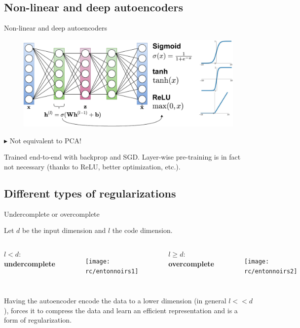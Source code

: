 \documentclass[handout]{beamer}
\begin{document}
  \subsection{Non-linear and deep autoencoders}

  \begin{frame}{Non-linear and deep autoencoders}

    \begin{figure}
      \includegraphics[width=\textwidth]{rc/deep-autoencoder}
    \end{figure}
    
    \pause
    \centering
    $\blacktriangleright$ \alert{Not equivalent to PCA!}

    \pause
    {\small Trained end-to-end with backprop and SGD. Layer-wise pre-training \cite{Hinton2006} is in fact not necessary (thanks to ReLU, better optimization, etc.).}

  \end{frame}

  \subsection{Different types of regularizations}

  \begin{frame}{Undercomplete or overcomplete}

    Let $d$ be the input dimension and $l$ the code dimension.
    \pause
    \vspace{0.5cm}
    \begin{columns}[T,onlytextwidth]
      \centering
      $l < d$: \textbf{undercomplete}
      \begin{figure}
        \texttt{[image: rc/entonnoirs1]}
      \end{figure}
      \pause
      \centering
      $l \geq d$: \textbf{overcomplete}
      \begin{figure}
        \texttt{[image: rc/entonnoirs2]}
      \end{figure}
    \end{columns}
    \vspace{0.5cm}
    \pause
    Having the autoencoder encode the data to a lower dimension (in general $l << d$), forces it to compress the data and learn an efficient representation and is a \alert{form of regularization}.
    
  \end{frame}
\end{document}
